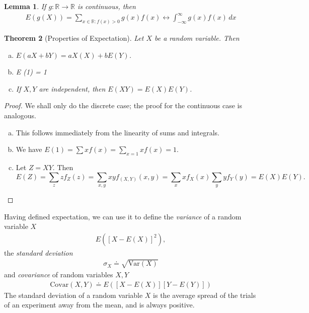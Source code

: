 \documentclass[12pt]{article}
\newcommand{\rr}{\mathbb{R}}
\newcommand{\var}{\text{Var}}
\newcommand{\covar}{\text{Covar}}
\theoremstyle{plain}
\newtheorem{theorem}{Theorem}
\newtheorem{lemma}[theorem]{Lemma}
\theoremstyle{definition}
\theoremstyle{remark}
\numberwithin{equation}{section}  %
\begin{document}
\begin{lemma}
	If $g: \rr \to \rr$ is continuous, then
	\begin{align*}
		E(g(X)) = \sum_{x \in \rr: f(x) > 0} g(x) f(x) \longleftrightarrow
		\int_{-\infty}^{\infty} g(x) f(x) \, dx
	\end{align*}
\end{lemma}
\begin{theorem}[Properties of Expectation]
	Let $X$ be a random variable. Then
	\begin{enumerate}[(a)]
		\item $E(a X + b Y) = a X(X) + b E(Y)$.
		\item E (1) = 1
		\item If $X,Y$ are independent, then $E(XY) = E(X)E(Y)$.
	\end{enumerate}
\end{theorem}
\begin{proof}
	We shall only do the discrete case; the proof for the continuous case is
	analogous.
	\begin{enumerate}[(a)]
		\item This follows immediately from the linearity of sums and integrals.
		\item
			We have $E(1) = \sum x f(x) = \sum_{x = 1} x f(x) = 1$.
		\item
			Let $Z = XY$. Then
			\[E(Z) = \sum_{z} z f_Z(z) = \sum_{x,y} x y f_{(X,Y)}(x,y) = \sum_x 
				x f_X(x)
			\sum_y y f_Y(y) = E(X) E(Y).\]
	\end{enumerate}
\end{proof}
Having defined expectation, we can use it to define the
\emph{variance} of a random variable $X$
\begin{align*}
	E({[X - E(X)]}^2),
\end{align*}
the \emph{standard deviation}
\begin{align*}
	\sigma_X \doteq \sqrt{\var(X)}
\end{align*}
and \emph{covariance} of random variables $X, Y$
\begin{align*}
	\covar(X,Y) \doteq E([X - E(X)][Y - E(Y)])
\end{align*}
The standard deviation of a random variable $X$ is the average spread of the
trials of an experiment away from the mean, and is always positive. 
\end{document}

